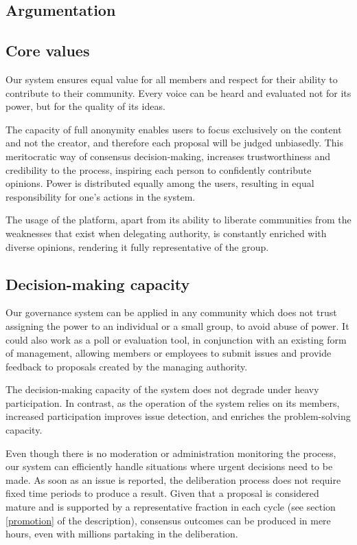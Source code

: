 \documentclass[a4paper,11pt]{article}
\begin{document}
\begin{multicols}{2}
\section{Argumentation} \label{argumentation}

\subsection{Core values} \label{core}

Our system ensures equal value for all members and respect for their ability to contribute to their community. Every voice can be heard and evaluated not for its power, but for the quality of its ideas.

The capacity of full anonymity enables users to focus exclusively on the content and not the creator, and therefore each proposal will be judged unbiasedly. This meritocratic way of consensus decision-making, increases trustworthiness and credibility to the process, inspiring each person to confidently contribute opinions. Power is distributed equally among the users, resulting in equal responsibility for one's actions in the system. 

The usage of the platform, apart from its ability to liberate communities from the weaknesses that exist when delegating authority, is constantly enriched with diverse opinions, rendering it fully representative of the group.

\subsection{Decision-making capacity} \label{capacity}

Our governance system can be applied in any community which does not trust assigning the power to an individual or a small group, to avoid abuse of power. It could also work as a poll or evaluation tool, in conjunction with an existing form of management, allowing members or employees to submit issues and provide feedback to proposals created by the managing authority.

The decision-making capacity of the system does not degrade under heavy participation. In contrast, as the operation of the system relies on its members, increased participation improves issue detection, and enriches the problem-solving capacity.

Even though there is no moderation or administration monitoring the process, our system can efficiently handle situations where urgent decisions need to be made. As soon as an issue is reported, the deliberation process does not require fixed time periods to produce a result. Given that a proposal is considered mature and is supported by a representative fraction in each cycle (see section \ref{promotion} of the description), consensus outcomes can be produced in mere hours, even with millions partaking in the deliberation.


\end{multicols}
\end{document}
